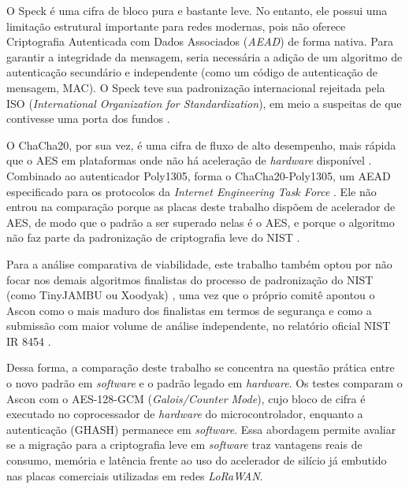 O Speck é uma cifra de bloco pura e bastante leve. No entanto, ele possui uma limitação estrutural importante para redes modernas, pois não oferece Criptografia Autenticada com Dados Associados (\textit{AEAD}) de forma nativa. Para garantir a integridade da mensagem, seria necessária a adição de um algoritmo de autenticação secundário e independente (como um código de autenticação de mensagem, MAC). O Speck teve sua padronização internacional rejeitada pela ISO (\textit{International Organization for Standardization}), em meio a suspeitas de que contivesse uma porta dos fundos \cite{register2018nsa}.

O ChaCha20, por sua vez, é uma cifra de fluxo de alto desempenho, mais rápida que o AES em plataformas onde não há aceleração de \textit{hardware} disponível \cite{nir2018rfc8439}. Combinado ao autenticador Poly1305, forma o ChaCha20-Poly1305, um AEAD especificado para os protocolos da \textit{Internet Engineering Task Force} \cite{nir2018rfc8439}. Ele não entrou na comparação porque as placas deste trabalho dispõem de acelerador de AES, de modo que o padrão a ser superado nelas é o AES, e porque o algoritmo não faz parte da padronização de criptografia leve do NIST \cite{nistir8454}.

Para a análise comparativa de viabilidade, este trabalho também optou por não focar nos demais algoritmos finalistas do processo de padronização do NIST (como TinyJAMBU ou Xoodyak) \cite{nist_lwc_finalists}, uma vez que o próprio comitê apontou o Ascon como o mais maduro dos finalistas em termos de segurança e como a submissão com maior volume de análise independente, no relatório oficial NIST IR 8454 \cite{nistir8454}.

Dessa forma, a comparação deste trabalho se concentra na questão prática entre o novo padrão em \textit{software} e o padrão legado em \textit{hardware}. Os testes comparam o Ascon com o AES-128-GCM (\textit{Galois/Counter Mode}), cujo bloco de cifra é executado no coprocessador de \textit{hardware} do microcontrolador, enquanto a autenticação (GHASH) permanece em \textit{software}. Essa abordagem permite avaliar se a migração para a criptografia leve em \textit{software} traz vantagens reais de consumo, memória e latência frente ao uso do acelerador de silício já embutido nas placas comerciais utilizadas em redes \textit{LoRaWAN}.

